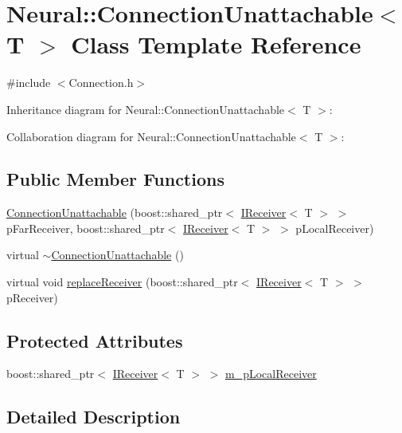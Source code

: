 \hypertarget{class_neural_1_1_connection_unattachable}{
\section{Neural::ConnectionUnattachable$<$ T $>$ Class Template Reference}
\label{class_neural_1_1_connection_unattachable}
}


{\ttfamily \#include $<$Connection.h$>$}



Inheritance diagram for Neural::ConnectionUnattachable$<$ T $>$:


Collaboration diagram for Neural::ConnectionUnattachable$<$ T $>$:
\subsection*{Public Member Functions}
\begin{DoxyCompactItemize}
\item 
\hyperlink{class_neural_1_1_connection_unattachable_aae8a7aee340b362cf7a570334faec42f}{ConnectionUnattachable} (boost::shared\_\-ptr$<$ \hyperlink{class_neural_1_1_i_receiver}{IReceiver}$<$ T $>$ $>$ pFarReceiver, boost::shared\_\-ptr$<$ \hyperlink{class_neural_1_1_i_receiver}{IReceiver}$<$ T $>$ $>$ pLocalReceiver)
\item 
virtual \hyperlink{class_neural_1_1_connection_unattachable_a41bab4855ff8f4eda669d8a686e135e7}{$\sim$ConnectionUnattachable} ()
\item 
virtual void \hyperlink{class_neural_1_1_connection_unattachable_a6a7e892132bf4cb07a4cf681109ed360}{replaceReceiver} (boost::shared\_\-ptr$<$ \hyperlink{class_neural_1_1_i_receiver}{IReceiver}$<$ T $>$ $>$ pReceiver)
\end{DoxyCompactItemize}
\subsection*{Protected Attributes}
\begin{DoxyCompactItemize}
\item 
boost::shared\_\-ptr$<$ \hyperlink{class_neural_1_1_i_receiver}{IReceiver}$<$ T $>$ $>$ \hyperlink{class_neural_1_1_connection_unattachable_a96b701eefbb2624e408e8ce8b6f72253}{m\_\-pLocalReceiver}
\end{DoxyCompactItemize}


\subsection{Detailed Description}
